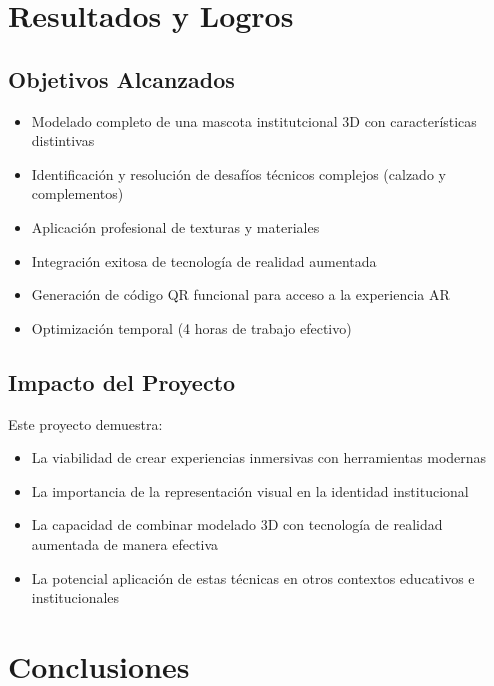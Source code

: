 \documentclass[12pt,a4paper]{article}
\begin{document}
\section{Resultados y Logros}

\subsection{Objetivos Alcanzados}

\begin{itemize}
    \item Modelado completo de una mascota institutcional 3D con características distintivas
    \item Identificación y resolución de desafíos técnicos complejos (calzado y complementos)
    \item Aplicación profesional de texturas y materiales
    \item Integración exitosa de tecnología de realidad aumentada
    \item Generación de código QR funcional para acceso a la experiencia AR
    \item Optimización temporal (4 horas de trabajo efectivo)
\end{itemize}

\subsection{Impacto del Proyecto}

Este proyecto demuestra:

\begin{itemize}
    \item La viabilidad de crear experiencias inmersivas con herramientas modernas
    \item La importancia de la representación visual en la identidad institucional
    \item La capacidad de combinar modelado 3D con tecnología de realidad aumentada de manera efectiva
    \item La potencial aplicación de estas técnicas en otros contextos educativos e institucionales
\end{itemize}

\section{Conclusiones}
\end{document}
